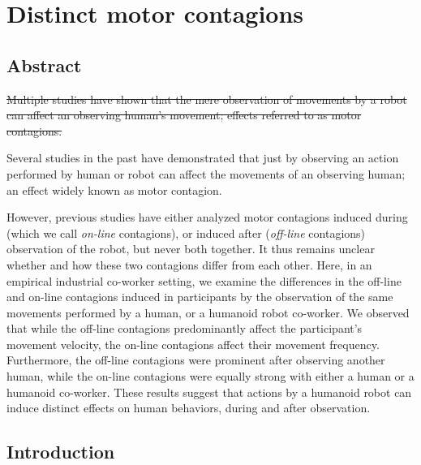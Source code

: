 
{\color{blue}\chapter{Distinct motor contagions}\label{distinct motor contagion}}


\section*{Abstract}

\sout{Multiple studies have shown that the mere observation of movements by a robot can affect an observing human's movement; effects referred to as motor contagions.}

Several studies in the past have demonstrated that just by observing an action performed by human or robot can affect the movements of an observing human; an effect widely known as motor contagion.


However, previous studies have either analyzed motor contagions induced during (which we call \emph{on-line} contagions), or induced after (\emph{off-line} contagions) observation of the robot, but never both together. It thus remains unclear whether and how these two contagions differ from each other. Here, in an empirical industrial co-worker setting, we examine the differences in the off-line and on-line contagions induced in participants by the observation of the same movements performed by a human, or a humanoid robot co-worker. We observed that while the off-line contagions predominantly affect the participant's movement velocity, the on-line contagions affect their movement frequency. Furthermore, the off-line contagions were prominent after observing another human, while the on-line contagions were equally strong with either a human or a humanoid co-worker. These results suggest that actions by a humanoid robot can induce distinct effects on human behaviors, during and after observation.  	

\clearpage
\section{Introduction}

